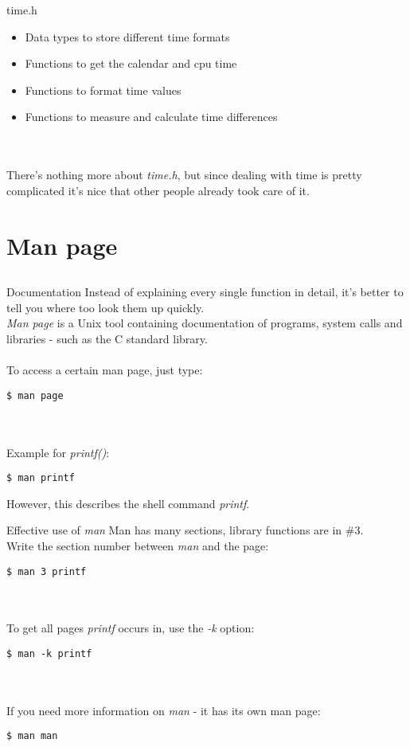 \begin{frame}{time.h}
	\begin{itemize}
		\item Data types to store different time formats
		\item Functions to get the calendar and cpu time
		\item Functions to format time values
		\item Functions to measure and calculate time differences
	\end{itemize} \ \\ \ \\
	There's nothing more about \textit{time.h}, but since dealing with time is pretty complicated it's nice that other people already took care of it.
\end{frame}

\section{Man page}
\subsection{}
\begin{frame}[fragile]{Documentation}
	Instead of explaining every single function in detail, it's better to tell you where too look them up quickly. \\
	\textit{Man page} is a Unix tool containing documentation of programs, system calls and libraries - such as the C standard library. \\ \ \\
	To access a certain man page, just type:
	\begin{lstlisting}[numbers=none, basicstyle=\itshape\small]
$ man page
\end{lstlisting} \ \\ \ \\
Example for \textit{printf()}:
	\begin{lstlisting}[numbers=none]
$ man printf
\end{lstlisting}
However, this describes the shell command \textit{printf}.
\end{frame}
\begin{frame}[fragile]{Effective use of \textit{man}}
	Man has many sections, library functions are in \#3. \\
	Write the section number between \textit{man} and the page:
	\begin{lstlisting}[numbers=none]
$ man 3 printf
\end{lstlisting} \ \\ \ \\
	To get all pages \textit{printf} occurs in, use the \textit{-k} option:
	\begin{lstlisting}[numbers=none]
$ man -k printf
\end{lstlisting} \ \\ \ \\
	If you need more information on \textit{man} - it has its own man page:
	\begin{lstlisting}[numbers=none]
$ man man
\end{lstlisting}
\end{frame}
